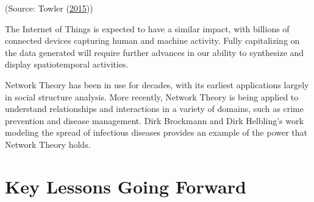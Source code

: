 \documentclass[]{book}
\begin{document}
(Source: Towler (\protect\hyperlink{ref-future_viz}{2015}))

The Internet of Things is expected to have a similar impact, with
billions of connected devices capturing human and machine activity.
Fully capitalizing on the data generated will require further advances
in our ability to synthesize and display spatiotemporal activities.

Network Theory has been in use for decades, with its earliest
applications largely in social structure analysis. More recently,
Network Theory is being applied to understand relationships and
interactions in a variety of domains, such as crime prevention and
disease management. Dirk Brockmann and Dirk Helbling's work modeling the
spread of infectious diseases provides an example of the power that
Network Theory holds.

\section{Key Lessons Going Forward}\label{key-lessons-going-forward}
\end{document}
